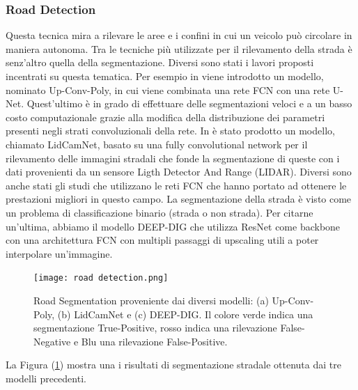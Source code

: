 \subsubsection{Road Detection}
Questa tecnica mira a rilevare le aree e i confini in cui un veicolo può circolare 
in maniera autonoma. Tra le tecniche più utilizzate per il rilevamento 
della strada è senz'altro quella della segmentazione. Diversi sono stati i 
lavori proposti incentrati su questa tematica. Per esempio in \cite{Up-conv-Poly} viene 
introdotto un modello, nominato Up-Conv-Poly, in cui viene combinata una 
rete FCN con una rete U-Net. Quest'ultimo è in grado di effettuare delle 
segmentazioni veloci e a un basso costo computazionale grazie alla modifica 
della distribuzione dei parametri presenti negli strati convoluzionali della 
rete. In \cite{CALTAGIRONE2019125} è stato prodotto un modello, chiamato LidCamNet, basato su 
una fully convolutional network per il rilevamento delle immagini stradali 
che fonde la segmentazione di queste con i dati provenienti da un sensore 
Ligth Detector And Range (LIDAR). Diversi sono anche stati gli studi che 
utilizzano le reti FCN che hanno portato ad ottenere le prestazioni migliori 
in questo campo. La segmentazione della strada è visto come un problema di 
classificazione binario (strada o non strada). Per citarne un'ultima, abbiamo 
il modello DEEP-DIG \cite{DEEP-DIG} che utilizza ResNet come backbone con una 
architettura FCN con multipli passaggi di upscaling utili a poter interpolare 
un'immagine. 
\begin{figure}
    \centering
    \texttt{[image: road detection.png]}
    \centering
    \caption{Road Segmentation proveniente dai diversi modelli: (a) Up-Conv-Poly, (b) LidCamNet e (c) DEEP-DIG. Il colore verde indica una segmentazione True-Positive, rosso indica una rilevazione False-Negative e Blu una rilevazione False-Positive.}
    \label{road-det}
\end{figure}
La Figura (\ref{road-det}) mostra una i risultati di segmentazione stradale ottenuta 
dai tre modelli precedenti.

